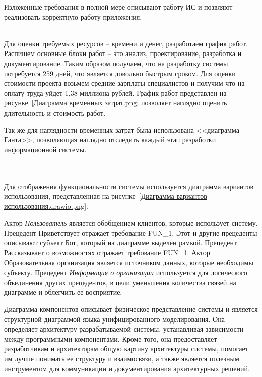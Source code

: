Изложенные требования в полной мере описывают работу ИС и позвляют реализовать
корректную работу приложения.

\\
Для оценки требуемых ресурсов – времени и денег, разработаем график работ. 
Распишем основные блоки работ – это анализ, проектирование, разработка и
документирование. Таким образом получаем, что на разработку системы потребуется
259 дней, что является довольно быстрым сроком. Для оценки стоимости проекта
возьмем средние зарплаты специалистов и получим что на оплату труда уйдет 1,38
миллиона рублей. График работ представлен на рисунке~\ref{Диаграмма временных затрат.png}
позволяет наглядно оценить длительность и стоимость работ.


Так же для наглядности временных затрат была использована <<диаграмма Ганта>>,
позволяющая наглядно отследить каждый этап разработки информационной системы.


\\
\\

Для отображения функциональности системы используется диаграмма вариантов
использования, представленная на рисунке~\ref{Диаграмма вариантов использования.drawio.png}.

Актор \emph{Пользователь} является обобщением клиентов, которые использует 
систему. Прецедент Приветствует отражает требование FUN\_1. Этот и другие
прецеденты описывают субъект Бот, который на диаграмме выделен рамкой.
Прецедент Рассказывает о возможностях отражает требование FUN\_1.
Актор Образовательная организация является источником данных, которые 
необходимы субъекту. Прецедент \emph{Информация о организации}
используется для логического объединения других прецедентов, в цели уменьшения 
количества связей на диаграмме и облегчить ее восприятие.


Диаграмма компонентов описывает физическое представление системы и является
структурной диаграммой языка унифицированного моделирования. Она определяет
архитектуру разрабатываемой системы, устанавливая зависимости между 
программными компонентами. Кроме того, она предоставляет разработчикам и
архитекторам общую картину архитектуры системы, помогает им лучше понимать ее
структуру и взаимосвязи, а также является полезным инструментом для
коммуникации и документирования архитектурных решений.

